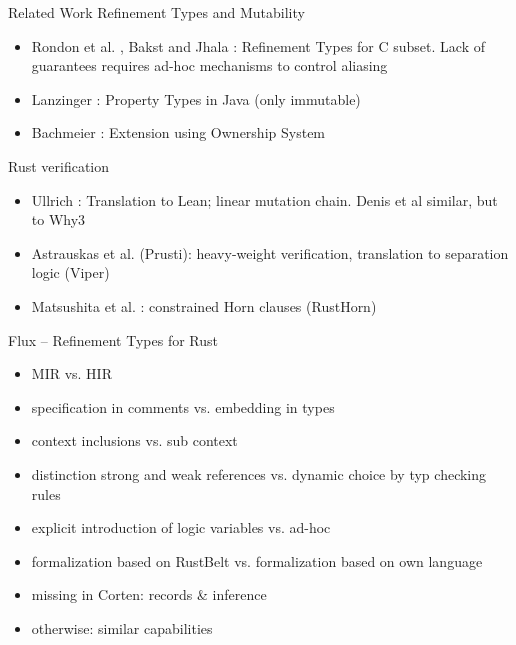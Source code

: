 \documentclass{sdqbeamer}
\begin{document}
\begin{frame}{Related Work}
  Refinement Types and Mutability
  \begin{itemize}
    \item Rondon et al. \cite{rondon_low-level_2010}, Bakst and Jhala \cite{bakst_predicate_2016}: Refinement Types for C subset. Lack of guarantees requires ad-hoc mechanisms to control aliasing
    \item Lanzinger \cite{lanzinger_property_2021}: Property Types in Java (only immutable)
    \item Bachmeier \cite{bachmeier_property_2022}: Extension using Ownership System
  \end{itemize}
  Rust verification
  \begin{itemize}
    \item Ullrich \cite{ullrich_simple_nodate}: Translation to Lean; linear mutation chain. Denis et al \cite{denis_creusot_2021} similar, but to Why3
    \item Astrauskas et al. \cite{astrauskas_leveraging_2019} (Prusti): heavy-weight verification, translation to separation logic (Viper)
    \item Matsushita et al. \cite{matsushita_rusthorn_2020}: constrained Horn clauses (RustHorn)
  \end{itemize}
\end{frame}

\begin{frame}{Flux -- Refinement Types for Rust}
  \begin{itemize}
    \item MIR vs. HIR
    \item specification in comments vs. embedding in types
    \item context inclusions vs. sub context
    \item distinction strong and weak references vs. dynamic choice by typ checking rules
    \item explicit introduction of logic variables vs. ad-hoc
    \item formalization based on RustBelt vs. formalization based on own language
    \item missing in Corten: records \& inference
    \item otherwise: similar capabilities
  \end{itemize}

  
\end{frame}
\end{document}
